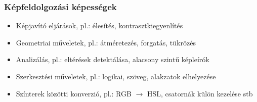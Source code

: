 \documentclass[a4paper,12pt,oneside]{report}
\begin{document}
\begin{itemize}
\end{itemize}


\subsubsection{Képfeldolgozási képességek}
\begin{itemize}
	\itemsep0em
	\item Képjavító eljárások, pl.: élesítés, kontrasztkiegyenlítés
	\item Geometriai műveletek, pl.: átméretezés, forgatás, tükrözés
	\item Analizálás, pl.: eltérések detektálása, alacsony szintű képleírók
	\item Szerkesztési műveletek, pl.: logikai, szöveg, alakzatok elhelyezése
	\item Színterek közötti konverzió, pl.: RGB $\rightarrow $ HSL, csatornák külön kezelése stb

\end{itemize}
\end{document}
